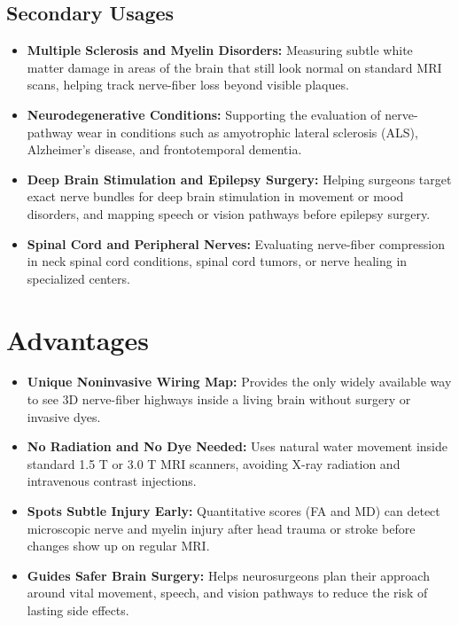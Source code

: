 \subsection{Secondary Usages}

\begin{itemize}
    \item \textbf{Multiple Sclerosis and Myelin Disorders:} Measuring subtle white matter damage in areas of the brain that still look normal on standard MRI scans, helping track nerve-fiber loss beyond visible plaques.
    \item \textbf{Neurodegenerative Conditions:} Supporting the evaluation of nerve-pathway wear in conditions such as amyotrophic lateral sclerosis (ALS), Alzheimer's disease, and frontotemporal dementia.
    \item \textbf{Deep Brain Stimulation and Epilepsy Surgery:} Helping surgeons target exact nerve bundles for deep brain stimulation in movement or mood disorders, and mapping speech or vision pathways before epilepsy surgery.
    \item \textbf{Spinal Cord and Peripheral Nerves:} Evaluating nerve-fiber compression in neck spinal cord conditions, spinal cord tumors, or nerve healing in specialized centers.
\end{itemize}

\section{Advantages}

\begin{itemize}
    \item \textbf{Unique Noninvasive Wiring Map:} Provides the only widely available way to see 3D nerve-fiber highways inside a living brain without surgery or invasive dyes.
    \item \textbf{No Radiation and No Dye Needed:} Uses natural water movement inside standard 1.5 T or 3.0 T MRI scanners, avoiding X-ray radiation and intravenous contrast injections.
    \item \textbf{Spots Subtle Injury Early:} Quantitative scores (FA and MD) can detect microscopic nerve and myelin injury after head trauma or stroke before changes show up on regular MRI.
    \item \textbf{Guides Safer Brain Surgery:} Helps neurosurgeons plan their approach around vital movement, speech, and vision pathways to reduce the risk of lasting side effects.
\end{itemize}

